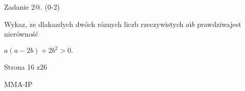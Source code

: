 \documentclass[a4paper,12pt]{article}
\begin{document}
Zadanie 2@. (0-2)

Wykaz, $\dot{\mathrm{z}}\mathrm{e}$ dlakazdych dwóch róznych liczb rzeczywistych $a\mathrm{i}b$ prawdziwajest nierówność

$a(a-2b)+2b^{2}>0.$

Strona 16 z26

MMA-IP
\end{document}
